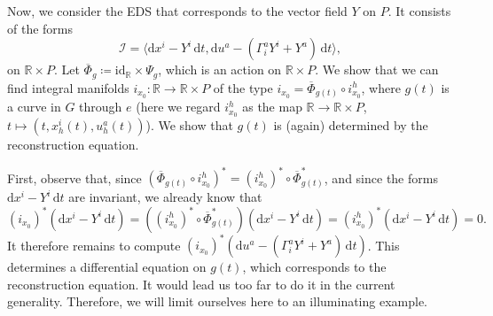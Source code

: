 \documentclass[11pt]{article}
\theoremstyle{plain}
\theoremstyle{definition}
\begin{document}
Now, we consider the EDS that corresponds to the vector field $Y$ on $P$. It consists of the forms
\begin{equation*}
    {\mathcal I} = \langle  {\mathrm d}x^i-Y^i \, {\mathrm d}t,  {\mathrm d}u^a - ( \Gamma^a_iY^i + Y^a) \, {\mathrm d}t\rangle,
\end{equation*}
on $\mathbb R \times P$. Let $\overline{\Phi}_g\coloneqq \mathrm{id}_{\mathbb{R}}\times \Psi_g$, which is an action on $\mathbb{R}\times P$. We show that we can find integral manifolds $i_{x_0}\colon \mathbb R \to \mathbb R \times P$ of the type $i_{x_0}=\overline{\Phi}_{g(t)}\circ i^h_{x_0}$, where $g(t)$ is a curve in $G$ through $e$ (here we regard $i^h_{x_0}$ as the map $\mathbb{R}\to \mathbb{R}\times P$, $t\mapsto (t,x_h^i(t),u_h^a(t))$). We show that $g(t)$ is (again) determined by the reconstruction equation.

First, observe that, since $(\overline{\Phi}_{g(t)}\circ i^h_{x_0})^{\ast} = (i^h_{x_0})^{\ast}\circ \overline{\Phi}_{g(t)}^{\ast}$, and since the forms ${\mathrm d}x^i-Y^i \, {\mathrm d}t$ are invariant, we already know that
\begin{equation*}
    (i_{x_0})^{\ast} ({\mathrm d}x^i-Y^i \, {\mathrm d}t) = ((i^h_{x_0})^{\ast}\circ \overline{\Phi}_{g(t)}^{\ast}) ({\mathrm d}x^i-Y^i \, {\mathrm d}t) = (i^h_{x_0})^{\ast}({\mathrm d}x^i-Y^i \, {\mathrm d}t) = 0.
\end{equation*}
It therefore remains to compute $(i_{x_0})^{\ast}({\mathrm d}u^a - ( \Gamma^a_iY^i + Y^a) \, {\mathrm d}t)$. This determines a differential equation on $g(t)$, which corresponds to the reconstruction equation. It would lead us too far to do it in the current generality. Therefore, we will limit ourselves here to an illuminating example.
\end{document}
